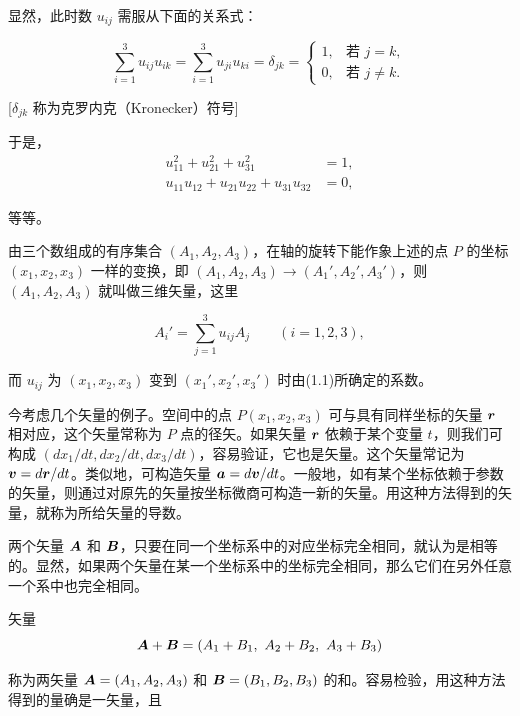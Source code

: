 显然，此时数 $u_{ij}$ 需服从下面的关系式：

\begin{equation}
\sum_{i=1}^{3} u_{ij} u_{ik} = \sum_{i=1}^{3} u_{ji} u_{ki} = \delta_{jk}
= \begin{cases} 1, & \text{若 } j = k,\\ 0, & \text{若 } j \neq k. \end{cases}
\tag{1.1a}
\end{equation}

[$\delta_{jk}$ 称为克罗内克（Kronecker）符号]

于是，
\begin{equation*}
\begin{aligned}
u_{11}^{2} + u_{21}^{2} + u_{31}^{2} &= 1,\\
u_{11} u_{12} + u_{21} u_{22} + u_{31} u_{32} &= 0,
\end{aligned}
\end{equation*}

等等。

由三个数组成的有序集合 $(A_1, A_2, A_3)$，在轴的旋转下能作象上述的点 $P$ 的坐标 $(x_1, x_2, x_3)$ 一样的变换，即
$(A_1, A_2, A_3) \longrightarrow (A_1', A_2', A_3')$，则 $(A_1, A_2, A_3)$ 就叫做三维矢量，这里

\begin{equation}
A_i' = \sum_{j=1}^{3} u_{ij} A_j \qquad (i = 1, 2, 3),
\tag{1.2}
\end{equation}

而 $u_{ij}$ 为 $(x_1, x_2, x_3)$ 变到 $(x_1', x_2', x_3')$ 时由(1.1)所确定的系数。

今考虑几个矢量的例子。空间中的点 $P(x_1, x_2, x_3)$ 可与具有同样坐标的矢量 $\bm{r}$ 相对应，这个矢量常称为 $P$ 点的径矢。如果矢量 $\bm{r}$ 依赖于某个变量 $t$，则我们可构成 $(dx_1/dt, dx_2/dt, dx_3/dt)$，容易验证，它也是矢量。这个矢量常记为 $\bm{v} = d\bm{r}/dt$。类似地，可构造矢量 $\bm{a} = d\bm{v}/dt$。一般地，如有某个坐标依赖于参数的矢量，则通过对原先的矢量按坐标微商可构造一新的矢量。用这种方法得到的矢量，就称为所给矢量的导数。

两个矢量 $\bm{A}$ 和 $\bm{B}$，只要在同一个坐标系中的对应坐标完全相同，就认为是相等的。显然，如果两个矢量在某一个坐标系中的坐标完全相同，那么它们在另外任意一个系中也完全相同。

矢量
\begin{equation*}
\bm{A} + \bm{B} = (A_1 + B_1,\ A_2 + B_2,\ A_3 + B_3)
\end{equation*}

称为两矢量 $\bm{A} = (A_1, A_2, A_3)$ 和 $\bm{B} = (B_1, B_2, B_3)$ 的和。容易检验，用这种方法得到的量确是一矢量，且


